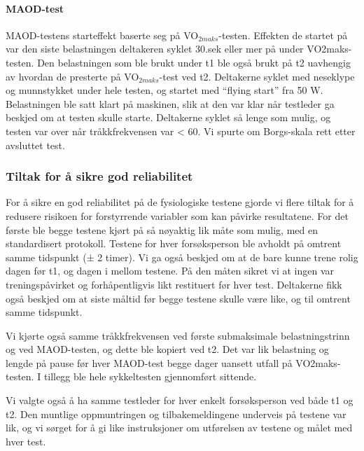 \documentclass[
  letterpaper,
  DIV=11,
  numbers=noendperiod]{scrartcl}
\let\oldparagraph\paragraph
\renewcommand{\paragraph}[1]{\oldparagraph{#1}\mbox{}}
\begin{document}
\hypertarget{maod-test}{%
\paragraph{MAOD-test}\label{maod-test}}

MAOD-testens starteffekt baserte seg på VO\(_{2maks}\)-testen. Effekten
de startet på var den siste belastningen deltakeren syklet 30.sek eller
mer på under VO2maks-testen. Den belastningen som ble brukt under t1 ble
også brukt på t2 uavhengig av hvordan de presterte på
VO\(_{2maks}\)-test ved t2. Deltakerne syklet med neseklype og
munnstykket under hele testen, og startet med ``flying start'' fra 50 W.
Belastningen ble satt klart på maskinen, slik at den var klar når
testleder ga beskjed om at testen skulle starte. Deltakerne syklet så
lenge som mulig, og testen var over når tråkkfrekvensen var \textless{}
60. Vi spurte om Borgs-skala rett etter avsluttet test.

\hypertarget{tiltak-for-uxe5-sikre-god-reliabilitet}{%
\subsubsection{Tiltak for å sikre god
reliabilitet}\label{tiltak-for-uxe5-sikre-god-reliabilitet}}

For å sikre en god reliabilitet på de fysiologiske testene gjorde vi
flere tiltak for å redusere risikoen for forstyrrende variabler som kan
påvirke resultatene. For det første ble begge testene kjørt på så
nøyaktig lik måte som mulig, med en standardisert protokoll. Testene for
hver forsøksperson ble avholdt på omtrent samme tidspunkt (± 2 timer).
Vi ga også beskjed om at de bare kunne trene rolig dagen før t1, og
dagen i mellom testene. På den måten sikret vi at ingen var
treningspåvirket og forhåpentligvis likt restituert før hver test.
Deltakerne fikk også beskjed om at siste måltid før begge testene skulle
være like, og til omtrent samme tidspunkt.

Vi kjørte også samme tråkkfrekvensen ved første submaksimale
belastningstrinn og ved MAOD-testen, og dette ble kopiert ved t2. Det
var lik belastning og lengde på pause før hver MAOD-test begge dager
uansett utfall på VO2maks-testen. I tillegg ble hele sykkeltesten
gjennomført sittende.

Vi valgte også å ha samme testleder for hver enkelt forsøksperson ved
både t1 og t2. Den muntlige oppmuntringen og tilbakemeldingene underveis
på testene var lik, og vi sørget for å gi like instruksjoner om
utførelsen av testene og målet med hver test.
\end{document}

